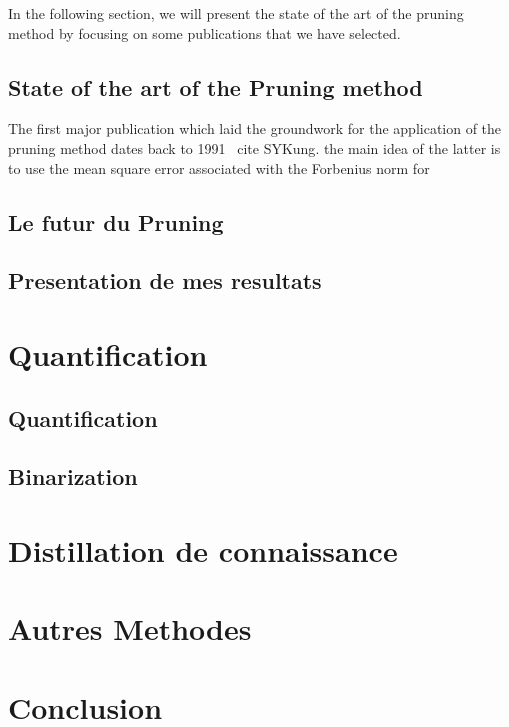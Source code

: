 \documentclass[twoside,twocolumn]{article}
\begin{document}
In the following section, we will present the state of the art of the pruning method by focusing on some publications that we have selected.

\subsection{State of the art of the Pruning method}

The first major publication which laid the groundwork for the application of the pruning method dates back to 1991 \ cite {SYKung}. the main idea of the latter is to 
use the mean square error associated with the Forbenius norm for

\subsection{Le futur du Pruning}
\subsection{Presentation de mes resultats}

\section{Quantification}%
\subsection{Quantification}
\subsection{Binarization}

\section{Distillation de connaissance} %


\section{Autres Methodes}%


\section{Conclusion}%



 

\end{document}

